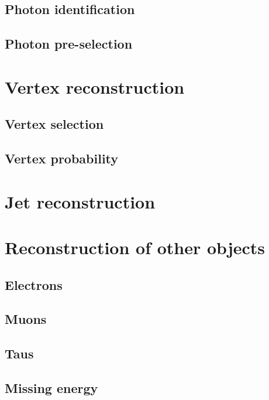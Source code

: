 \subsection{Photon identification}
\subsection{Photon pre-selection}

\section{Vertex reconstruction}
\subsection{Vertex selection}
\subsection{Vertex probability}

\section{Jet reconstruction}

\section{Reconstruction of other objects}
\subsection{Electrons}
\subsection{Muons}
\subsection{Taus}
\subsection{Missing energy}
